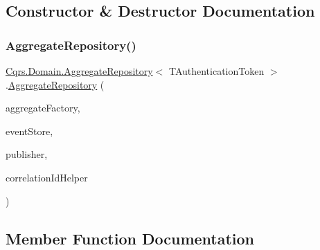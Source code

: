 \subsection{Constructor \& Destructor Documentation}
\mbox{\label{classCqrs_1_1Domain_1_1AggregateRepository_ae4a6c96b10c536a0df6a381659f87744}} 
\subsubsection{\texorpdfstring{Aggregate\+Repository()}{AggregateRepository()}}
{\footnotesize\ttfamily \hyperlink{classCqrs_1_1Domain_1_1AggregateRepository}{Cqrs.\+Domain.\+Aggregate\+Repository}$<$ T\+Authentication\+Token $>$.\hyperlink{classCqrs_1_1Domain_1_1AggregateRepository}{Aggregate\+Repository} (\begin{DoxyParamCaption}\item[{\hyperlink{interfaceCqrs_1_1Domain_1_1Factories_1_1IAggregateFactory}{I\+Aggregate\+Factory}}]{aggregate\+Factory,  }\item[{\hyperlink{interfaceCqrs_1_1Events_1_1IEventStore}{I\+Event\+Store}$<$ T\+Authentication\+Token $>$}]{event\+Store,  }\item[{\hyperlink{interfaceCqrs_1_1Events_1_1IEventPublisher}{I\+Event\+Publisher}$<$ T\+Authentication\+Token $>$}]{publisher,  }\item[{I\+Correlation\+Id\+Helper}]{correlation\+Id\+Helper }\end{DoxyParamCaption})}



\subsection{Member Function Documentation}
\mbox{\label{classCqrs_1_1Domain_1_1AggregateRepository_a64d82c57bbe49a11bd5cf20c5b86ce19}} 
